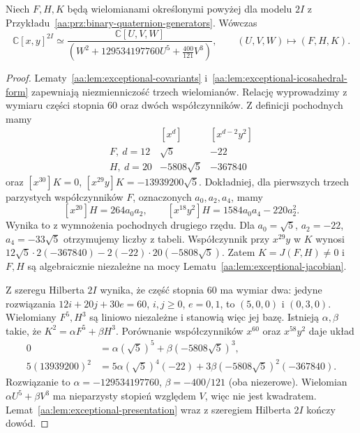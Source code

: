 \begin{twierdzenie}
\label{aa:tw:exceptional-e8}
Niech $F,H,K$ będą wielomianami określonymi
powyżej dla modelu $2I$ z
Przykładu~\ref{aa:prz:binary-quaternion-generators}.
Wówczas
\[
 \mathbb C[x,y]^{2I}\simeq
 \frac{\mathbb C[U,V,W]}
 { (W^2+129534197760U^5+\frac{400}{121}V^3) },
 \qquad (U,V,W)\longmapsto(F,H,K).
\]
\end{twierdzenie}
\begin{proof}
Lematy~\ref{aa:lem:exceptional-covariants}
i~\ref{aa:lem:exceptional-icosahedral-form}
zapewniają niezmienniczość trzech wielomianów.
Relację wyprowadzimy z wymiaru części stopnia $60$
oraz dwóch współczynników. Z definicji pochodnych mamy
\[
\begin{array}{c|rr}
 & [x^d] & [x^{d-2}y^2] \\ \hline
 F,\ d=12 & \sqrt5 & -22\\
 H,\ d=20 & -5808\sqrt5 & -367840
\end{array}
\]
oraz $[x^{30}]K=0$,
$[x^{29}y]K=-13939200\sqrt5$.
Dokładniej, dla pierwszych trzech parzystych
współczynników $F$, oznaczonych $a_0,a_2,a_4$,
mamy
\[
 [x^{20}]H=264a_0a_2,\qquad
 [x^{18}y^2]H=1584a_0a_4-220a_2^2.
\]
Wynika to z wymnożenia pochodnych drugiego rzędu.
Dla $a_0=\sqrt5$, $a_2=-22$, $a_4=-33\sqrt5$
otrzymujemy liczby z tabeli.
Współczynnik przy $x^{29}y$ w $K$ wynosi
$12\sqrt5\cdot2(-367840)-2(-22)\cdot20(-5808\sqrt5)$.
Zatem $K=J(F,H)\ne0$ i $F,H$ są algebraicznie niezależne
na mocy Lematu~\ref{aa:lem:exceptional-jacobian}.

Z szeregu Hilberta $2I$ wynika, że część stopnia $60$
ma wymiar dwa: jedyne rozwiązania
$12i+20j+30e=60$, $i,j\ge0$, $e=0,1$,
to $(5,0,0)$ i $(0,3,0)$.
Wielomiany $F^5,H^3$ są liniowo niezależne
i stanowią więc jej bazę. Istnieją $\alpha,\beta$
takie, że $K^2=\alpha F^5+\beta H^3$.
Porównanie współczynników $x^{60}$ oraz $x^{58}y^2$
daje układ
\[
\begin{aligned}
0&=\alpha(\sqrt5)^5+\beta(-5808\sqrt5)^3,\\
5(13939200)^2
 &=5\alpha(\sqrt5)^4(-22)
   +3\beta(-5808\sqrt5)^2(-367840).
\end{aligned}
\]
Rozwiązanie to $\alpha=-129534197760$, $\beta=-400/121$
(oba niezerowe). Wielomian $\alpha U^5+\beta V^3$
ma nieparzysty stopień względem $V$, więc nie jest kwadratem.
Lemat~\ref{aa:lem:exceptional-presentation} wraz z szeregiem Hilberta
$2I$ kończy dowód.
\end{proof}

